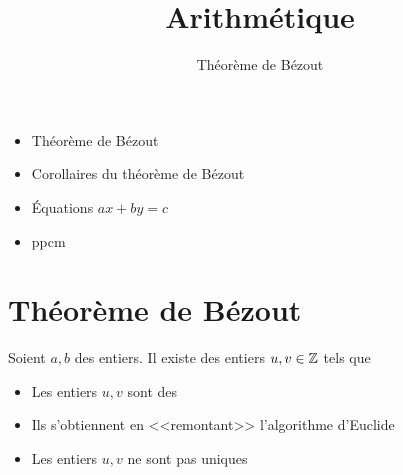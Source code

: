 










\title{{\bf Arithmétique}}
\subtitle{Théorème de Bézout}

\begin{frame}
  
  \debutmontitre

  \pause

{\footnotesize
\hfill
{}
\begin{minipage}{0.6\textwidth}
  \begin{itemize}
    \item<3-> Théorème de Bézout
    \item<4-> Corollaires du théorème de Bézout
    \item<5-> \'Equations $ax+by=c$
    \item<6-> ppcm
  \end{itemize}
\end{minipage}
}

\end{frame}

\setcounter{framenumber}{0}




\section{Théorème de Bézout}

\begin{frame}
  
\begin{theoreme}[de Bézout]
Soient $a,b$ des entiers. Il existe
des entiers $u,v \in \mathbb{Z}$ tels que 
\end{theoreme}

\pause
\bigskip

\begin{itemize}
  \item Les entiers $u,v$ sont des 
  \item Ils s'obtiennent en <<remontant>> l'algorithme d'Euclide
  \item Les entiers $u,v$ ne sont pas uniques
\end{itemize}

\end{frame}


